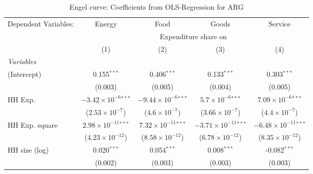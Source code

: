 
\begin{table}[htbp!]
   \centering
   \small
   \begin{adjustbox}{width = 1\textwidth, max height = 0.95\textheight, center}
      \begin{threeparttable}[b]
         \caption{\label{tab:Engel_parametric_ARG} Engel curve: Coefficients from OLS-Regression for ARG}
         \begin{tabular}{lcccc}
            \tabularnewline \midrule \midrule
            Dependent Variables: & Energy                         & Food                           & Goods                           & Service\\  
             & \multicolumn{4}{c}{Expenditure share on} \\ 
                                 & (1)                            & (2)                            & (3)                             & (4)\\  
            \midrule
            \emph{Variables}\\
            (Intercept)          & 0.155$^{***}$                  & 0.406$^{***}$                  & 0.133$^{***}$                   & 0.303$^{***}$\\   
                                 & (0.003)                        & (0.005)                        & (0.004)                         & (0.005)\\   
            HH Exp.              & $-3.42\times 10^{-6}$$^{***}$  & $-9.44\times 10^{-6}$$^{***}$  & $5.7\times 10^{-6}$$^{***}$     & $7.09\times 10^{-6}$$^{***}$\\    
                                 & ($2.53\times 10^{-7}$)         & ($4.6\times 10^{-7}$)          & ($3.66\times 10^{-7}$)          & ($4.4\times 10^{-7}$)\\    
            HH Exp. square       & $2.98\times 10^{-11}$$^{***}$  & $7.32\times 10^{-11}$$^{***}$  & $-3.71\times 10^{-11}$$^{***}$  & $-6.48\times 10^{-11}$$^{***}$\\    
                                 & ($4.23\times 10^{-12}$)        & ($8.58\times 10^{-12}$)        & ($6.78\times 10^{-12}$)         & ($8.35\times 10^{-12}$)\\    
            HH size (log)        & 0.020$^{***}$                  & 0.054$^{***}$                  & 0.008$^{***}$                   & -0.082$^{***}$\\   
                                 & (0.002)                        & (0.003)                        & (0.003)                         & (0.003)\\   

\end{tabular}
\end{threeparttable}
\end{adjustbox}
\end{table}
